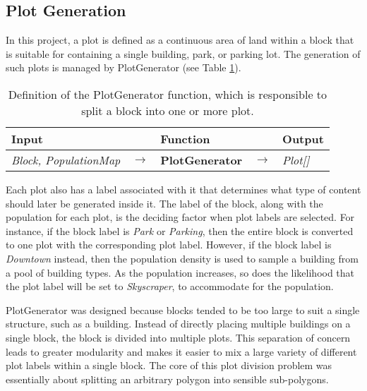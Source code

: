 \subsection{Plot Generation}  

In this project, a plot is defined as a continuous area of land within a block that is suitable for containing a single building, park, or parking lot.
The generation of such plots is managed by PlotGenerator (see Table \ref{table:plotgen}).

\begin{table}[H]
  \centering
  \begin{tabular}{lllll}
    \textbf{Input}                           &               & \textbf{Function}            &               & \textbf{Output}         \\
    \midrule
    \textit{Block, PopulationMap}            & $\rightarrow$ & \textbf{PlotGenerator}       & $\rightarrow$ & \textit{Plot[]}         \\
    \bottomrule
  \end{tabular}

  \caption{Definition of the PlotGenerator function, which is responsible to split a block into one or more plot.}
  \label{table:plotgen}
\end{table}
\vspace{-0.4cm} 

Each plot also has a label associated with it that determines what type of content should later be generated inside it. 
The label of the block, along with the population for each plot, is the deciding factor when plot labels are selected. 
For instance, if the block label is \textit{Park} or \textit{Parking}, then the entire block is converted to one plot with the corresponding plot label. 
However, if the block label is \textit{Downtown} instead, then the population density is used to sample a building from a pool of building types. 
As the population increases, so does the likelihood that the plot label will be set to \textit{Skyscraper}, to accommodate for the population. 

PlotGenerator was designed because blocks tended to be too large to suit a single structure, such as a building.
Instead of directly placing multiple buildings on a single block, the block is divided into multiple plots.
This separation of concern leads to greater modularity and makes it easier to mix a large variety of different plot labels within a single block.
The core of this plot division problem was essentially about splitting an arbitrary polygon into sensible sub-polygons. 

